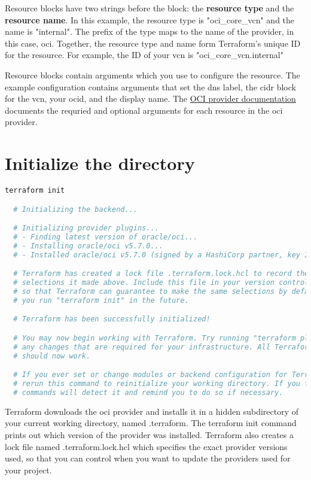 \documentclass[../main.tex]{subfiles}
\begin{document}
Resource blocks have two strings before the block: the \textbf{resource type} and the \textbf{resource name}.
In this example, the resource type is "oci\_core\_vcn" and the name is "internal".
The prefix of the type maps to the name of the provider, in this case, oci. 
Together, the resource type and name form Terraform's unique ID for the resource. For example, the ID of your \acrshort{vcn} is "oci\_core\_vcn.internal"

Resource blocks contain arguments which you use to configure the resource. The example configuration contains arguments that set the \acrfull{dns} label, the \acrfull{cidr} block for the \acrshort{vcn}, your \acrshort{ocid}, and the display name.
The \href{https://registry.terraform.io/providers/oracle/oci/latest}{OCI provider documentation} documents the requried and optional arguments for each resource in the \acrshort{oci} provider.

\section{Initialize the directory}
\begin{lstlisting}[language=bash]
  terraform init

  # Initializing the backend...

  # Initializing provider plugins...
  # - Finding latest version of oracle/oci...
  # - Installing oracle/oci v5.7.0...
  # - Installed oracle/oci v5.7.0 (signed by a HashiCorp partner, key ID 1533A49284137CEB)

  # Terraform has created a lock file .terraform.lock.hcl to record the provider
  # selections it made above. Include this file in your version control repository
  # so that Terraform can guarantee to make the same selections by default when
  # you run "terraform init" in the future.

  # Terraform has been successfully initialized!

  # You may now begin working with Terraform. Try running "terraform plan" to see
  # any changes that are required for your infrastructure. All Terraform commands
  # should now work.

  # If you ever set or change modules or backend configuration for Terraform,
  # rerun this command to reinitialize your working directory. If you forget, other
  # commands will detect it and remind you to do so if necessary.
\end{lstlisting}
Terraform downloads the oci provider and installs it in a hidden subdirectory of your current working directory, named .terraform. The terraform init command prints out which version of the provider was installed. Terraform also creates a lock file named .terraform.lock.hcl which specifies the exact provider versions used, so that you can control when you want to update the providers used for your project.
\end{document}
